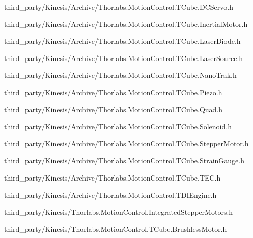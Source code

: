 \begin{DoxyCompactItemize}
third\+\_\+party/\+Kinesis/\+Archive/Thorlabs.\+Motion\+Control.\+T\+Cube.\+D\+C\+Servo.\+h\item 
third\+\_\+party/\+Kinesis/\+Archive/Thorlabs.\+Motion\+Control.\+T\+Cube.\+Inertial\+Motor.\+h\item 
third\+\_\+party/\+Kinesis/\+Archive/Thorlabs.\+Motion\+Control.\+T\+Cube.\+Laser\+Diode.\+h\item 
third\+\_\+party/\+Kinesis/\+Archive/Thorlabs.\+Motion\+Control.\+T\+Cube.\+Laser\+Source.\+h\item 
third\+\_\+party/\+Kinesis/\+Archive/Thorlabs.\+Motion\+Control.\+T\+Cube.\+Nano\+Trak.\+h\item 
third\+\_\+party/\+Kinesis/\+Archive/Thorlabs.\+Motion\+Control.\+T\+Cube.\+Piezo.\+h\item 
third\+\_\+party/\+Kinesis/\+Archive/Thorlabs.\+Motion\+Control.\+T\+Cube.\+Quad.\+h\item 
third\+\_\+party/\+Kinesis/\+Archive/Thorlabs.\+Motion\+Control.\+T\+Cube.\+Solenoid.\+h\item 
third\+\_\+party/\+Kinesis/\+Archive/Thorlabs.\+Motion\+Control.\+T\+Cube.\+Stepper\+Motor.\+h\item 
third\+\_\+party/\+Kinesis/\+Archive/Thorlabs.\+Motion\+Control.\+T\+Cube.\+Strain\+Gauge.\+h\item 
third\+\_\+party/\+Kinesis/\+Archive/Thorlabs.\+Motion\+Control.\+T\+Cube.\+T\+E\+C.\+h\item 
third\+\_\+party/\+Kinesis/\+Archive/Thorlabs.\+Motion\+Control.\+T\+D\+I\+Engine.\+h\item 
third\+\_\+party/\+Kinesis/Thorlabs.\+Motion\+Control.\+Integrated\+Stepper\+Motors.\+h\item 
third\+\_\+party/\+Kinesis/Thorlabs.\+Motion\+Control.\+T\+Cube.\+Brushless\+Motor.\+h\end{DoxyCompactItemize}
